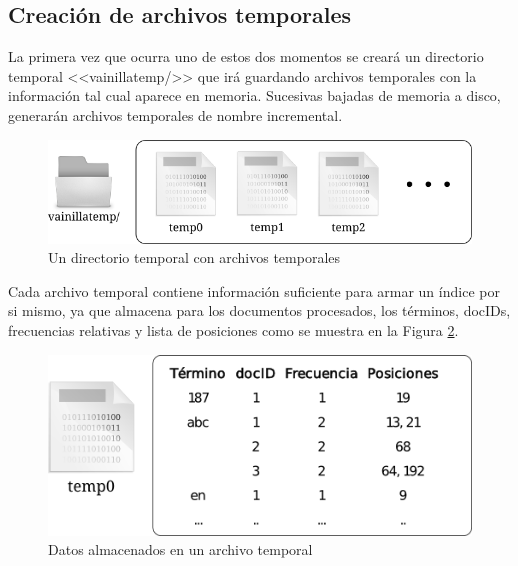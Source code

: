 \subsection{Creación de archivos temporales}

La primera vez que ocurra uno de estos dos momentos se creará un directorio temporal <<vainillatemp/>> que irá guardando archivos temporales con la información tal cual aparece en memoria. Sucesivas bajadas de memoria a disco, generarán archivos temporales de nombre incremental.

\begin{figure}[!h]
\centering
    \includegraphics[scale=0.9]{./Images/tempDirEstr.png}
\caption{Un directorio temporal con archivos temporales}
\label{fig:tempdir}
\end{figure}


Cada archivo temporal contiene información suficiente para armar un índice por si mismo, ya que almacena para los documentos procesados, los términos, docIDs, frecuencias relativas y lista de posiciones como se muestra en la Figura \ref{fig:tempfile}.


\begin{figure}[!h]
\centering
    \includegraphics[scale=0.9]{./Images/tempFileEstr.png}
\caption{Datos almacenados en un archivo temporal}
\label{fig:tempfile}
\end{figure}


